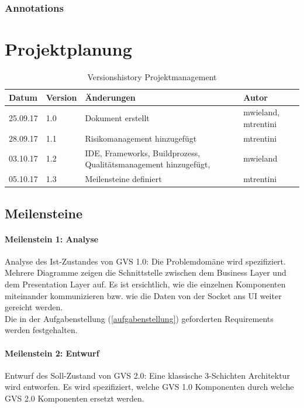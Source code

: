 \documentclass[11pt,a4paper,english,oneside]{book}
\numberwithin{equation}{chapter}
\begin{document}
	\subsection{Annotations}
	
	
	
	\chapter{Projektplanung}
	
	
	\begin{table}[h!]
		\centering
		\begin{tabularx}{\linewidth}{l l X l}
			\toprule 
			Datum & Version & Änderungen & Autor \\
			\midrule
			25.09.17 & 1.0 & Dokument erstellt & mwieland, mtrentini \\
			28.09.17 & 1.1 & Risikomanagement hinzugefügt & mtrentini \\
			03.10.17 & 1.2 & IDE, Frameworks, Buildprozess, Qualitätsmanagement hinzugefügt, & mwieland \\
			05.10.17 & 1.3 & Meilensteine definiert & mtrentini \\
			\bottomrule 
		\end{tabularx} 
		\caption{Versionshistory Projektmanagement} 
	\end{table}
	
	\section{Meilensteine}
	\label{sec:milestones}
	
	\subsubsection{Meilenstein 1: Analyse}
	Analyse des Ist-Zustandes von GVS 1.0: Die Problemdomäne wird spezifiziert. Mehrere Diagramme zeigen die Schnittstelle zwischen dem Business Layer und dem Presentation Layer auf. Es ist ersichtlich, wie die einzelnen Komponenten miteinander kommunizieren bzw. wie die Daten von der Socket ans UI weiter gereicht werden.\\
	Die in der Aufgabenstellung (\ref{aufgabenstellung}) geforderten Requirements werden festgehalten.
	
	\subsubsection{Meilenstein 2: Entwurf}
	\label{milestone2}
	Entwurf des Soll-Zustand von GVS 2.0: Eine klassische 3-Schichten Architektur wird entworfen. Es wird spezifiziert, welche GVS 1.0 Komponenten durch welche GVS 2.0 Komponenten ersetzt werden. 
	
\end{document}
